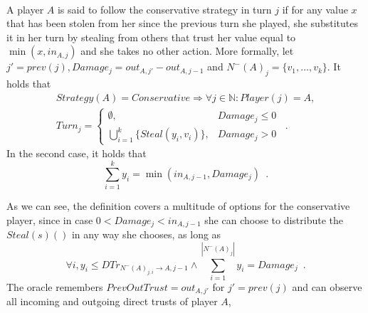 \documentclass[11pt]{llncs}
\begin{document}
     \begin{definition} \ \\
        A player $A$ is said to follow the conservative strategy in turn $j$ if for any value $x$ that has been stolen from
        her since the previous turn she played, she substitutes it in her turn by stealing from others that trust her value
        equal to $\min{(x,in_{A,j})}$ and she takes no other action.
        More formally, let $j' = prev\left(j\right), Damage_j = out_{A,j'} - out_{A,j-1}$ and $N^{-}\left(A\right)_j = \{v_1,
        \dots, v_k\}$. It holds that
        \begin{equation}
        \begin{gathered}
           Strategy\left(A\right) = Conservative \Rightarrow \forall j \in \mathbb{N}: Player\left(j\right) = A, \\
           Turn_j =
           \begin{cases}
              \emptyset, & Damage_j \leq 0 \\
              \bigcup\limits_{i=1}^{k}\{Steal\left(y_i,v_i\right)\}, & Damage_j > 0
           \end{cases} \enspace.
        \end{gathered}
        \end{equation}
        In the second case, it holds that
        \begin{equation}
           \sum\limits_{i=1}^{k}y_i = \min\left(in_{A,j-1}, Damage_j\right) \enspace.
        \end{equation}
     \end{definition}
     As we can see, the definition covers a multitude of options for the conservative player, since in case $0 < Damage_j <
     in_{A,j-1}$ she can choose to distribute the $Steal\left(s\right)\left(\right)$ in any way she chooses, as long as
     \begin{equation}
        \forall i, y_i \leq DTr_{N^{-}\left(A\right)_{j,i} \rightarrow A, j-1}
        \wedge \sum\limits_{i=1}^{|N^{-}\left(A\right)_j|}y_i = Damage_j \enspace.
     \end{equation}
     The oracle remembers $PrevOutTrust = out_{A, j'}$ for  $j' = prev\left(j\right)$ and can observe all incoming and
     outgoing direct trusts of player $A$,
\end{document}
